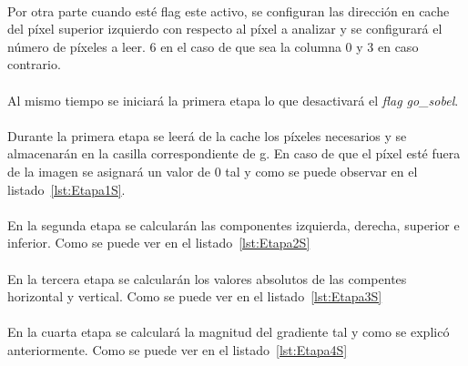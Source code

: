 \documentclass[a4paper,12pt,titlepage,final]{book}
\begin{document}
\pagebreak


\paragraph{}
Por otra parte cuando esté flag este activo, se configuran las dirección en cache del píxel superior izquierdo con respecto al píxel a analizar y se configurará el número de píxeles a leer. 6 en el caso de que sea la columna 0 y 3 en caso contrario.

\paragraph{}
Al mismo tiempo se iniciará la primera etapa lo que desactivará el \textit{flag go\_sobel}.

\paragraph{}
Durante la primera etapa se leerá de la cache los píxeles necesarios y se almacenarán en la casilla correspondiente de g. En caso de que el píxel esté fuera de la imagen se asignará un valor de 0 tal y como se puede observar en el listado~\ref{lst:Etapa1S}.



\paragraph{}
En la segunda etapa se calcularán las componentes izquierda, derecha, superior e inferior. Como se puede ver en el listado~\ref{lst:Etapa2S}



\paragraph{}
En la tercera etapa se calcularán los valores absolutos de las compentes horizontal y vertical. Como se puede ver en el listado~\ref{lst:Etapa3S}



\paragraph{}
En la cuarta etapa se calculará la magnitud del gradiente tal y como se explicó anteriormente. Como se puede ver en el listado~\ref{lst:Etapa4S}
\end{document}
